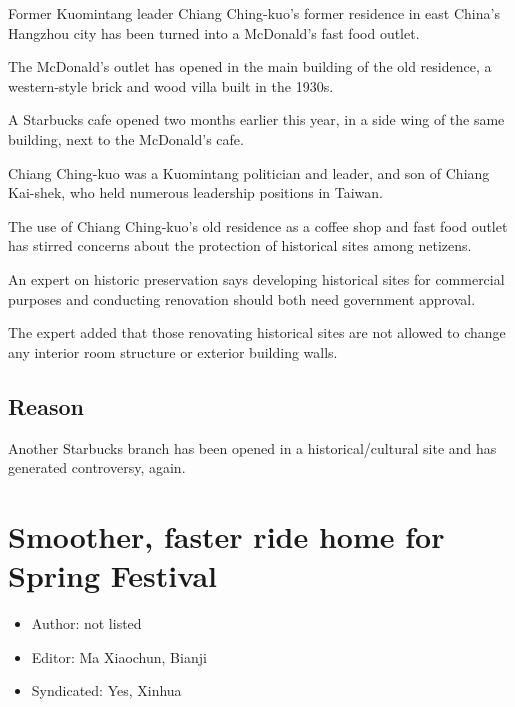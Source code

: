 \begin{displayquote}

	Former Kuomintang leader Chiang Ching-kuo's former residence in east
	China's Hangzhou city has been turned into a McDonald's fast food
	outlet.

	The McDonald's outlet has opened in the main building of the old
	residence, a western-style brick and wood villa built in the 1930s.

	A Starbucks cafe opened two months earlier this year, in a side wing of
	the same building, next to the McDonald's cafe.

	Chiang Ching-kuo was a Kuomintang politician and leader, and son of
	Chiang Kai-shek, who held numerous leadership positions in Taiwan.

	The use of Chiang Ching-kuo's old residence as a coffee shop and fast
	food outlet has stirred concerns about the protection of historical
	sites among netizens.

	An expert on historic preservation says developing historical sites for
	commercial purposes and conducting renovation should both need
	government approval.

	The expert added that those renovating historical sites are not allowed
	to change any interior room structure or exterior building walls.

\end{displayquote}

\subsection{Reason}

Another Starbucks branch has been opened in a historical/cultural site and has
generated controversy, again.

\section{Smoother, faster ride home for Spring Festival}

\begin{itemize}
	\item Author: not listed
	\item Editor: Ma Xiaochun, Bianji
	\item Syndicated: Yes, Xinhua
\end{itemize}

